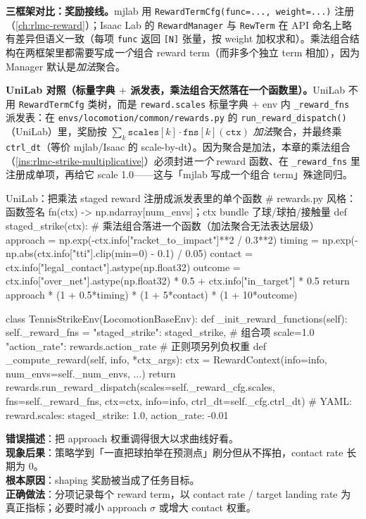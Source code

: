 \textbf{三框架对比：奖励接线。}mjlab 用 \verb|RewardTermCfg(func=..., weight=...)| 注册（\cref{ch:rlmc-reward}）；Isaac Lab 的 \verb|RewardManager| 与 \verb|RewTerm| 在 API 命名上略有差异但语义一致（每项 \verb|func| 返回 \verb|[N]| 张量，按 weight 加权求和）。乘法组合结构在两框架里都需要写成\emph{一个}组合 reward term（而非多个独立 term 相加），因为 Manager 默认是\emph{加法}聚合。

\textbf{UniLab 对照（标量字典 $+$ 派发表，乘法组合天然落在一个函数里）。}UniLab 不用 \verb|RewardTermCfg| 类树，而是 \verb|reward.scales| 标量字典 $+$ env 内 \verb|_reward_fns| 派发表：在 \verb|envs/locomotion/common/rewards.py| 的 \verb|run_reward_dispatch()|（UniLab）里，奖励按 $\sum_k \texttt{scales}[k]\cdot\texttt{fns}[k](\texttt{ctx})$ \emph{加法}聚合，并最终乘 \verb|ctrl_dt|（等价 mjlab/Isaac 的 scale-by-dt）。因为聚合是加法，本章的乘法组合（\cref{ins:rlmc-strike-multiplicative}）必须封进\emph{一个} reward 函数、在 \verb|_reward_fns| 里注册成单项，再给它 scale 1.0——这与「mjlab 写成一个组合 term」殊途同归。

\begin{codebox}[Python]{UniLab：把乘法 staged reward 注册成派发表里的单个函数}
# rewards.py 风格：函数签名 fn(ctx) -> np.ndarray[num_envs]；ctx bundle 了球/球拍/接触量
def staged_strike(ctx):                     # 乘法组合落进一个函数（加法聚合无法表达层级）
    approach = np.exp(-ctx.info["racket_to_impact"]**2 / 0.3**2)
    timing   = np.exp(-np.abs(ctx.info["tti"].clip(min=0) - 0.1) / 0.05)
    contact  = ctx.info["legal_contact"].astype(np.float32)
    outcome  = ctx.info["over_net"].astype(np.float32) * 0.5 + ctx.info["in_target"] * 0.5
    return approach * (1 + 0.5*timing) * (1 + 5*contact) * (1 + 10*outcome)

class TennisStrikeEnv(LocomotionBaseEnv):
    def _init_reward_functions(self):
        self._reward_fns = {"staged_strike": staged_strike,           # 组合项 scale=1.0
                            "action_rate": rewards.action_rate}        # 正则项另列负权重
    def _compute_reward(self, info, *ctx_args):
        ctx = RewardContext(info=info, num_envs=self._num_envs, ...)
        return rewards.run_reward_dispatch(scales=self._reward_cfg.scales,
            fns=self._reward_fns, ctx=ctx, info=info, ctrl_dt=self._cfg.ctrl_dt)
# YAML: reward.scales: {staged_strike: 1.0, action_rate: -0.01}
\end{codebox}

\begin{pitfall}
\textbf{错误描述}：把 approach 权重调得很大以求曲线好看。\\
\textbf{现象后果}：策略学到「一直把球拍举在预测点」刷分但从不挥拍，contact rate 长期为 0。\\
\textbf{根本原因}：shaping 奖励被当成了任务目标。\\
\textbf{正确做法}：分项记录每个 reward term，以 contact rate / target landing rate 为真正指标；必要时减小 approach $\sigma$ 或增大 contact 权重。
\end{pitfall}

